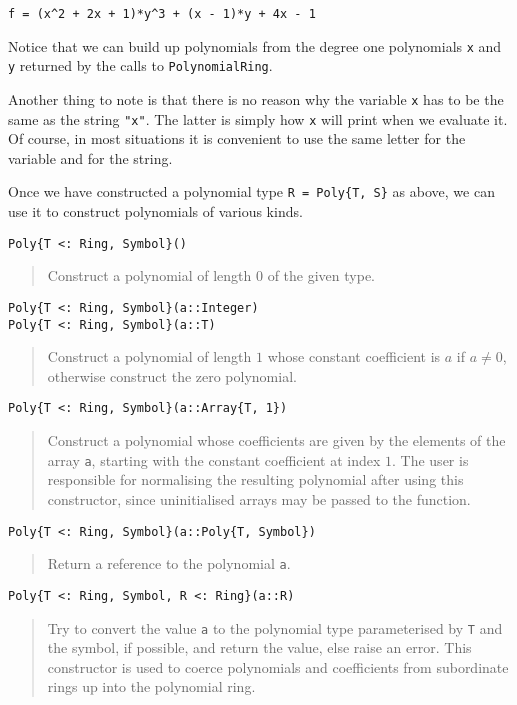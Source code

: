 \documentclass[a4paper,10pt]{article}
\newcommand{\code}{\lstinline}
\newcommand{\desc}[1]{\vspace{-3mm}\begin{quote}#1\end{quote}}
\begin{document}
{{{{{{\begin{lstlisting}
f = (x^2 + 2x + 1)*y^3 + (x - 1)*y + 4x - 1
\end{lstlisting}

Notice that we can build up polynomials from the degree one polynomials \code{x} and
\code{y} returned by the calls to \code{PolynomialRing}. 

Another thing to note is that there is no reason why the variable \code{x} has to 
be the same as the string \code{"x"}. The latter is simply how \code{x} will print
when we evaluate it. Of course, in most situations it is convenient to use the same 
letter for the variable and for the string.

Once we have constructed a polynomial type \code|R = Poly{T, S}| as above, we can
use it to construct polynomials of various kinds.

\begin{lstlisting}
Poly{T <: Ring, Symbol}()
\end{lstlisting}

\desc{Construct a polynomial of length $0$ of the given type.}

\begin{lstlisting}
Poly{T <: Ring, Symbol}(a::Integer)
Poly{T <: Ring, Symbol}(a::T)
\end{lstlisting}

\desc{Construct a polynomial of length $1$ whose constant coefficient is $a$ if
$a \neq 0$, otherwise construct the zero polynomial.}

\begin{lstlisting}
Poly{T <: Ring, Symbol}(a::Array{T, 1})
\end{lstlisting}

\desc{Construct a polynomial whose coefficients are given by the elements of the array
\code{a}, starting with the constant coefficient at index $1$. The user is responsible
for normalising the resulting polynomial after using this constructor, since 
uninitialised arrays may be passed to the function.}

\begin{lstlisting}
Poly{T <: Ring, Symbol}(a::Poly{T, Symbol})
\end{lstlisting}

\desc{Return a reference to the polynomial \code{a}.}

\begin{lstlisting}
Poly{T <: Ring, Symbol, R <: Ring}(a::R)
\end{lstlisting}

\desc{Try to convert the value \code{a} to the polynomial type parameterised by 
\code{T} and the symbol, if possible, and return the value, else raise an error. 
This constructor is used to coerce polynomials and coefficients from subordinate rings up
into the polynomial ring.}

}}}}}}
\end{document}
